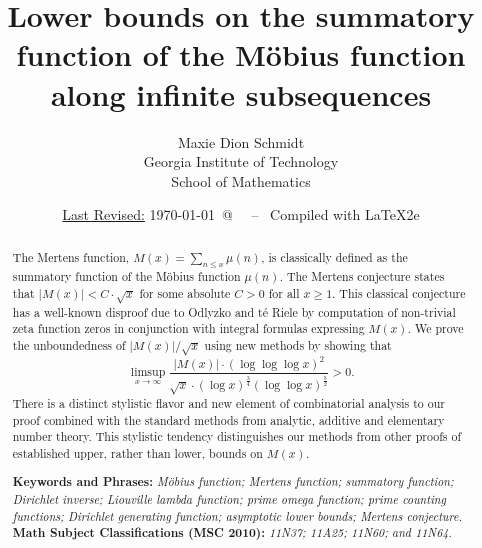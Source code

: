\documentclass[11pt,reqno,a4letter]{article}
\title{
       \LARGE{
       Lower bounds on the summatory function of the M\"obius function along infinite subsequences 
       } 
}
\author{{\Large Maxie Dion Schmidt} \\ 
        {\normalsize Georgia Institute of Technology} \\[0.025cm] 
        {\normalsize School of Mathematics} 
}
\date{\small\underline{Last Revised:} \today \ @\ \hhmmsstime{} \ -- \ Compiled with \LaTeX2e}
\numberwithin{figure}{section}
\numberwithin{table}{section}
\theoremstyle{plain}
\numberwithin{theorem}{section}
\theoremstyle{definition}
\begin{document}
 

\maketitle

\begin{abstract} 
The Mertens function, $M(x) = \sum_{n \leq x} \mu(n)$, is classically 
defined as the summatory function of the M\"obius function $\mu(n)$. 
The Mertens conjecture states that $|M(x)| < C \cdot \sqrt{x}$ for some absolute $C > 0$ for all 
$x \geq 1$. 
This classical conjecture has a well-known disproof due to 
Odlyzko and t\'{e} Riele by computation of 
non-trivial zeta function zeros in conjunction with integral formulas expressing $M(x)$. 
We prove the unboundedness of $|M(x)| / \sqrt{x}$ using new methods by showing that 
$$\limsup_{x \rightarrow \infty} \frac{|M(x)| \cdot (\log\log\log x)^{2}}{ 
  \sqrt{x} \cdot (\log x)^{\frac{3}{4}} (\log\log x)^{\frac{5}{2}}} > 0.$$ 
There is a distinct stylistic 
flavor and new element of combinatorial analysis to our proof 
combined with the standard methods from analytic, additive and elementary number theory. 
This stylistic tendency distinguishes 
our methods from other proofs of established upper, rather than lower, bounds on $M(x)$. 

\bigskip 
\noindent
\textbf{Keywords and Phrases:} {\it M\"obius function; Mertens function; summatory function; 
                                    Dirichlet inverse; Liouville lambda function; prime omega function; 
                                    prime counting functions; Dirichlet generating function; 
                                    asymptotic lower bounds; Mertens conjecture. } \\ 
\textbf{Math Subject Classifications (MSC 2010):} {\it 11N37; 11A25; 11N60; and 11N64. } 
\end{abstract} 

\end{document}
